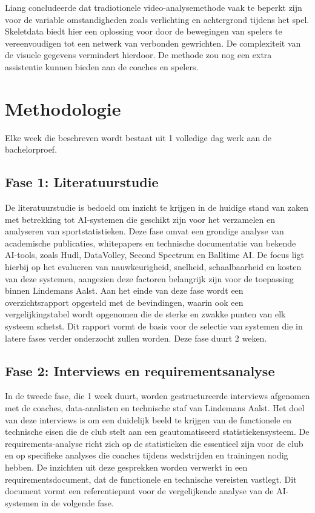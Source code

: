 Liang \textcite{Liang2023} concludeerde dat tradiotionele video-analysemethode vaak te beperkt zijn voor de 
variable omstandigheden zoals verlichting en achtergrond tijdens het spel. Skeletdata biedt hier een oplossing  
voor door de bewegingen van spelers te vereenvoudigen tot een netwerk van verbonden gewrichten. De complexiteit 
van de visuele gegevens vermindert hierdoor. De methode zou nog een extra assistentie kunnen bieden aan de
coaches en spelers. 

\section{Methodologie}%
\label{sec:methodologie}

Elke week die beschreven wordt bestaat uit 1 volledige dag werk aan de bachelorproef.
\subsection{Fase 1: Literatuurstudie}
De literatuurstudie is bedoeld om inzicht te krijgen in de huidige stand van zaken met betrekking tot AI-systemen die geschikt zijn voor het verzamelen en analyseren van sportstatistieken. Deze fase omvat een grondige analyse van academische publicaties, whitepapers en technische documentatie van bekende AI-tools, zoals Hudl, DataVolley, Second Spectrum en Balltime AI. De focus ligt hierbij op het evalueren van nauwkeurigheid, snelheid, schaalbaarheid en kosten van deze systemen, aangezien deze factoren belangrijk zijn voor de toepassing binnen Lindemans Aalst. Aan het einde van deze fase wordt een overzichtsrapport opgesteld met de bevindingen, waarin ook een vergelijkingstabel wordt opgenomen die de sterke en zwakke punten van elk systeem schetst. Dit rapport vormt de basis voor de selectie van systemen die in latere fases verder onderzocht zullen worden. Deze fase duurt 2 weken.
\subsection{Fase 2: Interviews en requirementsanalyse}
In de tweede fase, die 1 week duurt, worden gestructureerde interviews afgenomen met de coaches, data-analisten en technische staf van Lindemans Aalst. Het doel van deze interviews is om een duidelijk beeld te krijgen van de functionele en technische eisen die de club stelt aan een geautomatiseerd statistiekensysteem. De requirements-analyse richt zich op de statistieken die essentieel zijn voor de club en op specifieke analyses die coaches tijdens wedstrijden en trainingen nodig hebben. De inzichten uit deze gesprekken worden verwerkt in een requirementsdocument, dat de functionele en technische vereisten vastlegt. Dit document vormt een referentiepunt voor de vergelijkende analyse van de AI-systemen in de volgende fase.
